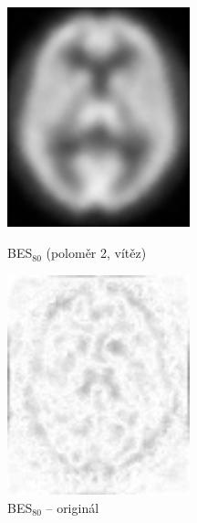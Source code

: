     \begin{figure}[h]
        \begin{minipage}[l]{0.5\textwidth}
            \center
            \includegraphics[width = 150pt]{src/8Appendix/final/10-100besL.png}
            \caption{BES$_{80}$ (poloměr 2, vítěz)}
        \end{minipage}
        \begin{minipage}[r]{0.5\textwidth}
            \center
            \includegraphics[width = 150pt]{src/8Appendix/final/10-100besLD.png}
            \caption{BES$_{80}$ -- originál}
        \end{minipage}
    \end{figure}
    ~\vfill~
    \newpage

